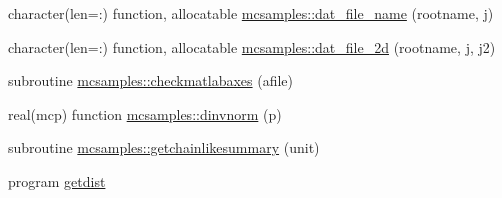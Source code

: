 \begin{DoxyCompactItemize}
\item 
character(len=\+:) function, allocatable \mbox{\hyperlink{namespacemcsamples_a8613f88e39f47c058447963d5b9f53dc}{mcsamples\+::dat\+\_\+file\+\_\+name}} (rootname, j)
\item 
character(len=\+:) function, allocatable \mbox{\hyperlink{namespacemcsamples_ab816e54fd85d1f1c125d828e843a2343}{mcsamples\+::dat\+\_\+file\+\_\+2d}} (rootname, j, j2)
\item 
subroutine \mbox{\hyperlink{namespacemcsamples_ad44656764a16d6b3b6acbbab57653252}{mcsamples\+::checkmatlabaxes}} (afile)
\item 
real(mcp) function \mbox{\hyperlink{namespacemcsamples_af7511fd6eb58bcc6086256f9ecb5fe1c}{mcsamples\+::dinvnorm}} (p)
\item 
subroutine \mbox{\hyperlink{namespacemcsamples_a97959f867d590fadb6638910b52409bd}{mcsamples\+::getchainlikesummary}} (unit)
\item 
program \mbox{\hyperlink{GetDist_8f90_a78c185cfd3ac27937ede022b24ae72e9}{getdist}}
\end{DoxyCompactItemize}
